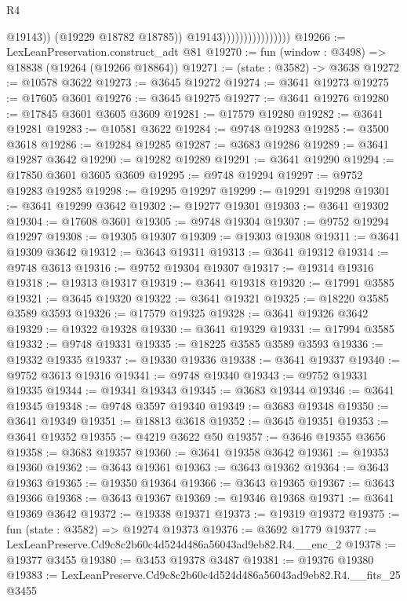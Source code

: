 \begin{lexlean}{R4}
\begin{coremodule}
                                          @19143))
                                      (@19229 @18782 @18785))
                                    @19143))))))))))))))))
@19266 := LexLeanPreservation.construct_adt @81
@19270 := fun (window : @3498) => @18838 (@19264 (@19266 @18864))
@19271 := (state : @3582) -> @3638
@19272 := @10578 @3622
@19273 := @3645 @19272
@19274 := @3641 @19273
@19275 := @17605 @3601
@19276 := @3645 @19275
@19277 := @3641 @19276
@19280 := @17845 @3601 @3605 @3609
@19281 := @17579 @19280
@19282 := @3641 @19281
@19283 := @10581 @3622
@19284 := @9748 @19283
@19285 := @3500 @3618
@19286 := @19284 @19285
@19287 := @3683 @19286
@19289 := @3641 @19287 @3642
@19290 := @19282 @19289
@19291 := @3641 @19290
@19294 := @17850 @3601 @3605 @3609
@19295 := @9748 @19294
@19297 := @9752 @19283 @19285
@19298 := @19295 @19297
@19299 := @19291 @19298
@19301 := @3641 @19299 @3642
@19302 := @19277 @19301
@19303 := @3641 @19302
@19304 := @17608 @3601
@19305 := @9748 @19304
@19307 := @9752 @19294 @19297
@19308 := @19305 @19307
@19309 := @19303 @19308
@19311 := @3641 @19309 @3642
@19312 := @3643 @19311
@19313 := @3641 @19312
@19314 := @9748 @3613
@19316 := @9752 @19304 @19307
@19317 := @19314 @19316
@19318 := @19313 @19317
@19319 := @3641 @19318
@19320 := @17991 @3585
@19321 := @3645 @19320
@19322 := @3641 @19321
@19325 := @18220 @3585 @3589 @3593
@19326 := @17579 @19325
@19328 := @3641 @19326 @3642
@19329 := @19322 @19328
@19330 := @3641 @19329
@19331 := @17994 @3585
@19332 := @9748 @19331
@19335 := @18225 @3585 @3589 @3593
@19336 := @19332 @19335
@19337 := @19330 @19336
@19338 := @3641 @19337
@19340 := @9752 @3613 @19316
@19341 := @9748 @19340
@19343 := @9752 @19331 @19335
@19344 := @19341 @19343
@19345 := @3683 @19344
@19346 := @3641 @19345
@19348 := @9748 @3597 @19340
@19349 := @3683 @19348
@19350 := @3641 @19349
@19351 := @18813 @3618
@19352 := @3645 @19351
@19353 := @3641 @19352
@19355 := @4219 @3622 @50
@19357 := @3646 @19355 @3656
@19358 := @3683 @19357
@19360 := @3641 @19358 @3642
@19361 := @19353 @19360
@19362 := @3643 @19361
@19363 := @3643 @19362
@19364 := @3643 @19363
@19365 := @19350 @19364
@19366 := @3643 @19365
@19367 := @3643 @19366
@19368 := @3643 @19367
@19369 := @19346 @19368
@19371 := @3641 @19369 @3642
@19372 := @19338 @19371
@19373 := @19319 @19372
@19375 := fun (state : @3582) => @19274 @19373
@19376 := @3692 @1779
@19377 := LexLeanPreserve.Cd9c8c2b60c4d524d486a56043ad9eb82.R4.__enc_2
@19378 := @19377 @3455
@19380 := @3453 @19378 @3487
@19381 := @19376 @19380
@19383 := LexLeanPreserve.Cd9c8c2b60c4d524d486a56043ad9eb82.R4.__fits_25 @3455

\end{coremodule}
\end{lexlean}
